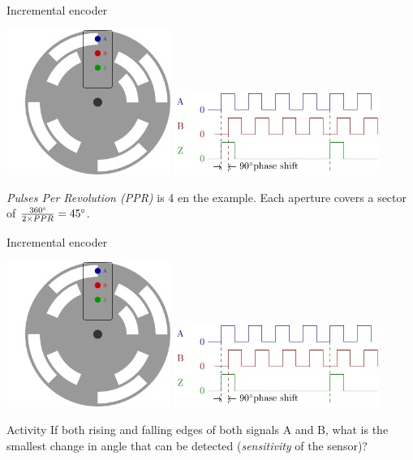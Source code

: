 \documentclass[presentation,aspectratio=169]{beamer}
\begin{document}
\begin{frame}[label={sec:org5eeffed}]{Incremental encoder}
\begin{center}
\includegraphics[width=0.4\textwidth]{../../figures/encoder-disc}
\includegraphics[width=0.5\textwidth]{../../figures/encoder-signals}
\end{center}

\emph{Pulses Per Revolution (PPR)} is 4 en the example. Each aperture covers a sector of \(\frac{360\degree}{2 \times PPR} = 45\degree\).
\end{frame}

\begin{frame}[label={sec:org3f531f4}]{Incremental encoder}
\begin{center}
\includegraphics[width=0.4\textwidth]{../../figures/encoder-disc}
\includegraphics[width=0.5\textwidth]{../../figures/encoder-signals}
\end{center}

\alert{Activity} If both rising \alert{and} falling edges of both signals \textcolor{blue!80!black}{A} and \textcolor{red!80!black}{B}, what is the smallest change in angle that can be detected (\emph{sensitivity} of the sensor)?
\end{frame}
\end{document}

